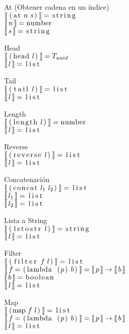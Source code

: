 \documentclass{article}
\newcommand{\cd}[1]{\text{\lstinline[columns=fixed]{#1}}}
\newcommand{\lbr}{\llbracket}
\newcommand{\rbr}{\rrbracket}
\newcommand{\typx}[1]{\lbr\, #1 \,\rbr}
\begin{document}
  At (Obtener cadena en un índice)\\
  $\typx{\cd{(at}\ n\ s\cd{)}} = \cd{string}$\\
  $\typx{n} = \cd{number}$\\
  $\typx{s} = \cd{string}$

  Head\\
  $\typx{\cd{(head}\ l\cd{)}} = T_{uuid}$\\
  $\typx{l} = \cd{list}$

  Tail\\
  $\typx{\cd{(tail}\ l\cd{)}} = \cd{list}$\\
  $\typx{l} = \cd{list}$

  Length\\
  $\typx{\cd{(length}\ l\cd{)}} = \cd{number}$\\
  $\typx{l} = \cd{list}$

  Reverse\\
  $\typx{\cd{(reverse}\ l\cd{)}} = \cd{list}$\\
  $\typx{l} = \cd{list}$

  Concatenación\\
  $\typx{\cd{(concat}\ l_1\ l_2\cd{)}} = \cd{list}$\\
  $\typx{l_1} = \cd{list}$\\
  $\typx{l_2} = \cd{list}$

  Lista a String\\
  $\typx{\cd{(lstostr}\ l\cd{)}} = \cd{string}$\\
  $\typx{l} = \cd{list}$

  Filter\\
  $\typx{\cd{(filter}\ f\ l\cd{)}} = \cd{list}$\\
  $\typx{f = \cd{(lambda (}p\cd{)}\ b\cd{)}} = \typx{p} \rightarrow \typx{b}$\\
  $\typx{b} = \cd{boolean}$\\
  $\typx{l} = \cd{list}$

  Map\\
  $\typx{\cd{(map}\ f\ l\cd{)}} = \cd{list}$\\
  $\typx{f = \cd{(lambda (}p\cd{)}\ b\cd{)}} = \typx{p} \rightarrow \typx{b}$\\
  $\typx{l} = \cd{list}$
\end{document}
